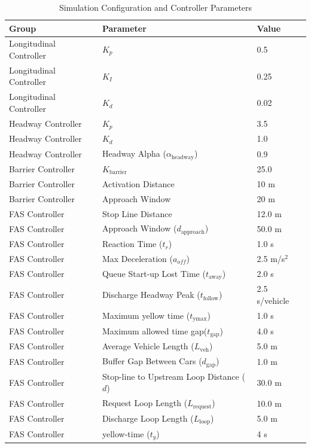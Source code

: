 \begin{table}[H]
\caption{Simulation Configuration and Controller Parameters}
\centering
\begin{tabular}{lll}
\toprule
\textbf{Group} & \textbf{Parameter} & \textbf{Value} \\
\midrule
Longitudinal Controller & $K_p$ & 0.5 \\
Longitudinal Controller & $K_I$ & 0.25 \\
Longitudinal Controller & $K_d$ & 0.02 \\
\midrule
Headway Controller & $K_p$ & 3.5 \\
Headway Controller & $K_d$ & 1.0 \\
Headway Controller & Headway Alpha ($\alpha_\text{headway}$) & 0.9 \\

\midrule
Barrier Controller & $K_{\text{barrier}}$ & 25.0 \\
Barrier Controller & Activation Distance & 10 m \\
Barrier Controller & Approach Window & 20 m \\
\midrule
FAS Controller & Stop Line Distance & 12.0 m \\
FAS Controller  & Approach Window (\(d_\text{approach}\)) & 50.0 m \\
FAS Controller & Reaction Time ($t_r$) & 1.0 s \\
FAS Controller  & Max Deceleration ($a_{off}$) & 2.5 m/s$^2$ \\
FAS Controller & Queue Start-up Lost Time ($t_{\text{away}}$) & 2.0 s \\
FAS Controller & Discharge Headway Peak ($t_{\text{follow}}$) & 2.5 s/vehicle \\
FAS Controller & Maximum yellow time ($t_{\text{ymax}}$) & 1.0 s \\
FAS Controller & Maximum allowed time gap($t_{\text{gap}}$) & 4.0 s \\
FAS Controller & Average Vehicle Length ($L_{\text{veh}}$) & 5.0 m \\
FAS Controller & Buffer Gap Between Cars ($d_{\text{gap}}$) & 1.0 m \\
FAS Controller & Stop-line to Upstream Loop Distance ($d$) & 30.0 m \\
FAS Controller & Request Loop Length ($L_{\text{request}}$) & 10.0 m \\
FAS Controller & Discharge Loop  Length ($L_{\text{loop}}$) & 5.0 m \\
FAS Controller & yellow-time (\(t_y\)) & 4 s \\

\end{tabular}
\end{table}

